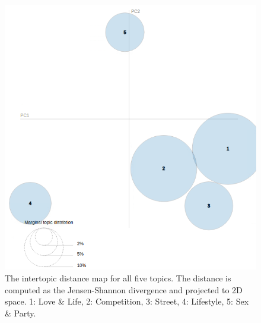 \documentclass[conference]{IEEEtran}
\begin{document}
\begin{figure}[!t]
\includegraphics[width=\linewidth]{figures/topic_dist.png}
\vspace*{-8mm}
\caption{The intertopic distance map for all five topics. The distance is computed as the Jensen-Shannon divergence and projected to 2D space. 1: Love \& Life, 2: Competition, 3: Street, 4: Lifestyle, 5: Sex \& Party.}
\label{fig:topic_dist}
\end{figure}
\end{document}
